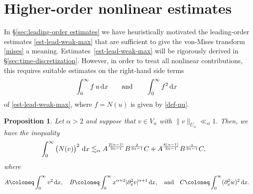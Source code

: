 \documentclass[reqno,12pt]{amsart}
\renewcommand{\d}{\ensuremath{\mathrm{d}}}
\renewcommand{\d}{\ensuremath{{\rm d}}}
\newtheorem{proposition}[theorem]{Proposition}
\numberwithin{equation}{section}
\begin{document}
\section{Higher-order nonlinear estimates\label{sec:higher-est}}
%
In \S\ref{sec:leading-order estimates} we have heuristically motivated the leading-order estimates \eqref{est-lead-weak-max} that are sufficient to give the von-Mises transform \eqref{mises} a meaning. Estimates~\eqref{est-lead-weak-max} will be rigorously derived in \S\ref{sec:time-discretization}. However, in order to treat all nonlinear contributions, this requires suitable estimates on the right-hand side terms
%
\[
\int_0^\infty f \, u \, \d x \qquad \text{and} \qquad \int_0^\infty f^2 \, \d x
\]
%
of \eqref{est-lead-weak-max}, where $f = N(u)$ is given by \eqref{def-nu}.
%
\begin{proposition}\label{prop-est-nv}
Let $\alpha > 2$ and suppose that $v \in V_\alpha$ with  $\|v\|_{U_\alpha} \ll_\alpha 1$. Then, we have the inequality
%
\begin{align}\label{est-nv}
    \int_0^\infty \big(N(v)\big)^2\, \, \d x
    &\lesssim_\alpha
    A^\frac{2(\alpha-1)}{3\alpha-1}
    B^\frac{2}{3\alpha-1}
    C+
    A^\frac{4(\alpha-1)}{3\alpha-1}
    B^\frac{4}{3\alpha-1}
    C, 
\end{align}
%
where
%
\begin{equation}\label{eq:def_ABC_2}
    A \coloneq 
    \int_0^\infty v^2\, \d x,
    \quad
    B \coloneq \int_0^\infty x^{\alpha+2} |\partial_x^2 v|^{\alpha+1}\, \d x,
    \quad \text{and} \quad
    C \coloneq \int_0^\infty (\partial_x^2 w)^2\, \d x.
\end{equation}
\end{proposition}
%
\end{document}
